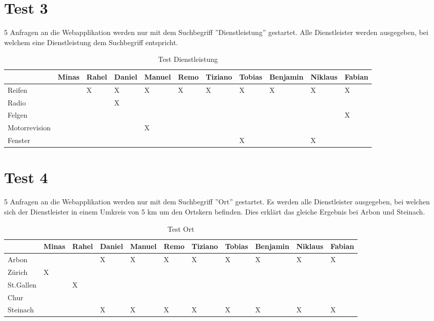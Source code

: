 \documentclass[11pt,a4paper]{scrreprt}
\begin{document}
{\section{Test 3}

5 Anfragen an die Webapplikation werden nur mit dem Suchbegriff ''Dienstleistung''  gestartet. Alle Dienstleister werden ausgegeben, bei welchem eine Dienstleistung dem Suchbegriff entspricht. 
\begin{table}[H]
\begin{tabular}{|p{2.4cm}|p{0.9cm}| p{0.9cm}|p{1.0cm}|p{1.1cm}|p{0.9cm}|p{1.2cm}|p{1.2cm}|p{1.5cm}|p{1.1cm}|p{1.1cm}|}\hline      			& Minas 	&  Rahel & Daniel   & Manuel 	&  Remo  & Tiziano   & Tobias   & Benjamin   &  Niklaus  &  Fabian    \\ \hline
  Reifen 	  	&    &  X &  X	& X  & X  & X  & X  & X  & X  & X    \\ \hline
  Radio 		&    &    &  X	&    &    &    &    &    &    &      \\ \hline
  Felgen		&    &    &   	&    &    &    &    &    &    & X    \\ \hline
  Motorrevision &    &    &   	& X  &    &    &    &    &    &      \\ \hline
  Fenster 		&    &    &   	&    &    &    & X  &    & X  &      \\ \hline
 \end{tabular}       
\caption{Test Dienstleistung}       
\end{table}      

\section{Test 4}

5 Anfragen an die Webapplikation werden nur mit dem Suchbegriff ''Ort'' gestartet. 
Es werden alle Dienstleister ausgegeben, bei welchen sich der Dienstleister in einem Umkreis von 5 km um den Ortskern befinden. Dies erklärt das gleiche Ergebnis bei Arbon und Steinach.

\begin{table}[H]
\begin{tabular}{|p{2.4cm}|p{0.9cm}| p{0.9cm}|p{1.0cm}|p{1.1cm}|p{0.9cm}|p{1.2cm}|p{1.2cm}|p{1.5cm}|p{1.1cm}|p{1.1cm}|}\hline      			& Minas 	&  Rahel & Daniel   & Manuel 	&  Remo  & Tiziano   & Tobias   & Benjamin   &  Niklaus  &  Fabian    \\ \hline
  Arbon 	  	&     &     &  X  &  X  &  X  &  X  &  X  &  X  &  X  &  X    \\ \hline
  Zürich 		&  X  &     &     &     &     &     &     &     &     &       \\ \hline
  St.Gallen		&     &  X  &     &     &     &     &     &     &     &       \\ \hline
  Chur 			&     &     &     &     &     &     &     &     &     &       \\ \hline
  Steinach 		&     &     &  X  &  X  &  X  &  X  &  X  &  X  &  X  &  X    \\ \hline
 \end{tabular}       
\caption{Test Ort} 
\end{table}      
}
\end{document}
